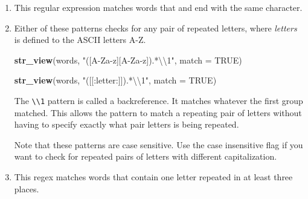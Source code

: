 \documentclass[]{book}
\newenvironment{Shaded}{\begin{snugshade}}{\end{snugshade}}
\newcommand{\CharTok}[1]{\textcolor[rgb]{0.31,0.60,0.02}{#1}}
\newcommand{\DataTypeTok}[1]{\textcolor[rgb]{0.13,0.29,0.53}{#1}}
\newcommand{\KeywordTok}[1]{\textcolor[rgb]{0.13,0.29,0.53}{\textbf{#1}}}
\newcommand{\NormalTok}[1]{#1}
\newcommand{\OperatorTok}[1]{\textcolor[rgb]{0.81,0.36,0.00}{\textbf{#1}}}
\newcommand{\OtherTok}[1]{\textcolor[rgb]{0.56,0.35,0.01}{#1}}
\newcommand{\StringTok}[1]{\textcolor[rgb]{0.31,0.60,0.02}{#1}}
\theoremstyle{plain}
\theoremstyle{remark}
\begin{document}
\begin{enumerate}
\def\labelenumi{\arabic{enumi}.}
\item
  This regular expression matches words that and end with the same character.

\begin{Shaded}
\end{Shaded}
\item
  Either of these patterns checks for any pair of repeated letters, where
  \emph{letters} is defined to the ASCII letters A-Z.

\begin{Shaded}
\begin{Highlighting}[]
\KeywordTok{str_view}\NormalTok{(words, }\StringTok{"([A-Za-z][A-Za-z]).*}\CharTok{\textbackslash{}\textbackslash{}}\StringTok{1"}\NormalTok{, }\DataTypeTok{match =} \OtherTok{TRUE}\NormalTok{)}
\end{Highlighting}
\end{Shaded}

\begin{Shaded}
\begin{Highlighting}[]
\KeywordTok{str_view}\NormalTok{(words, }\StringTok{"([[:letter:]]).*}\CharTok{\textbackslash{}\textbackslash{}}\StringTok{1"}\NormalTok{, }\DataTypeTok{match =} \OtherTok{TRUE}\NormalTok{)}
\end{Highlighting}
\end{Shaded}

  The \texttt{\textbackslash{}\textbackslash{}1} pattern is called a backreference. It matches whatever the first group
  matched. This allows the pattern to match a repeating pair of letters without having
  to specify exactly what pair letters is being repeated.

  Note that these patterns are case sensitive. Use the
  case insensitive flag if you want to check for repeated pairs
  of letters with different capitalization.
\item
  This regex matches words that contain one letter repeated in at least three places.


\end{enumerate}
\end{document}

